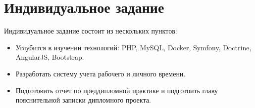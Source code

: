 \section{Индивидуальное задание}
\label{sec:practice:individual_task}
Индивидуальное задание состоит из нескольких пунктов:
\begin{itemize}
  \item Углубится в изучении технологий: PHP, MySQL, Docker, Symfony, Doctrine, AngularJS, Bootstrap.
  \item Разработать систему учета рабочего и личного времени.
  \item Подготовить отчет по преддипломной практике и подготоить главу пояснительной записки дипломного проекта.
\end{itemize}